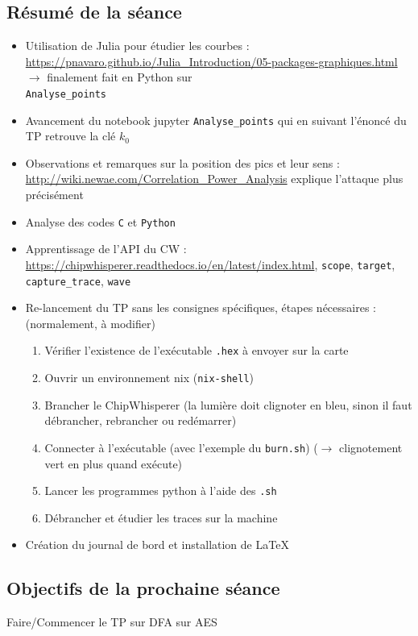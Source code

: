 \documentclass[12pt]{article}
\newcommand{\cmark}{\ding{51}}%
\newcommand{\done}{\rlap{$\square$}{\raisebox{2pt}{\large\hspace{1pt}\cmark}}%
	\hspace{-2.5pt}}
\begin{document}
	\subsection{Résumé de la séance}
	\begin{itemize}
		\item Utilisation de Julia pour étudier les courbes : \url{https://pnavaro.github.io/Julia_Introduction/05-packages-graphiques.html} $\rightarrow$ finalement fait en Python sur \\ \verb|Analyse_points|
		\item Avancement du notebook jupyter \verb|Analyse_points| qui en suivant l'énoncé du TP retrouve la clé $k_0$
		\item Observations et remarques sur la position des pics et leur sens : \url{http://wiki.newae.com/Correlation_Power_Analysis} explique l'attaque plus précisément
		\item Analyse des codes \verb|C| et \verb|Python|
		\item Apprentissage de l'API du CW : \url{https://chipwhisperer.readthedocs.io/en/latest/index.html}, \verb|scope|, \verb|target|, \verb|capture_trace|, \verb|wave|
		\item Re-lancement du TP sans les consignes spécifiques, étapes nécessaires : (normalement, à modifier) 
		\begin{enumerate}
			\item Vérifier l'existence de l'exécutable \verb|.hex| à envoyer sur la carte
			\item Ouvrir un environnement nix (\verb|nix-shell|)
			\item Brancher le ChipWhisperer (la lumière doit clignoter en bleu, sinon il faut débrancher, rebrancher ou redémarrer)
			\item Connecter à l'exécutable (avec l'exemple du \verb|burn.sh|) ($\rightarrow$ clignotement vert en plus quand exécute)
			\item Lancer les programmes python à l'aide des \verb|.sh|
			\item Débrancher et étudier les traces sur la machine
		\end{enumerate}
		\item Création du journal de bord et installation de \LaTeX
	\end{itemize}
	
	\subsection{Objectifs de la prochaine séance}
	\begin{todolist}
		\item[\done] Faire/Commencer le TP sur DFA sur AES
	\end{todolist}
	
\end{document}
